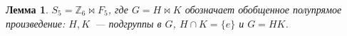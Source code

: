 \documentclass[utf8,a4paper,draft]{article}
\newtheorem{lemma_cub}{Лемма}
\newtheorem*{def_cub}{Определение}
\begin{document}
\begin{lemma_cub}
$S_5=\mathbb{Z}_6\bowtie F_5$, где $G=H\bowtie K$ обозначает обобщенное полупрямое произведение: $H, K$~--- подгруппы в $G$, $H\cap K=\{e\}$ и $G=HK$.
\end{lemma_cub}
\end{document}
